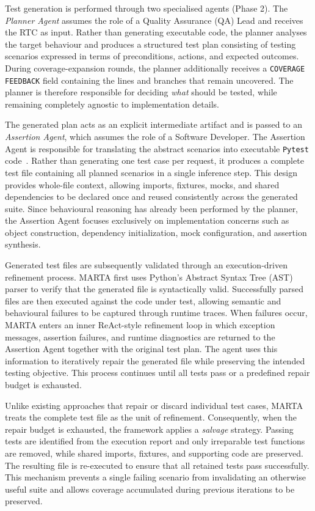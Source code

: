 \documentclass{llncs}
\begin{document}
Test generation is performed through two specialised agents (Phase 2). The \textit{Planner Agent} assumes the role of a Quality Assurance (QA) Lead and receives the RTC as input. Rather than generating executable code, the planner analyses the target behaviour and produces a structured test plan consisting of testing scenarios expressed in terms of preconditions, actions, and expected outcomes. During coverage-expansion rounds, the planner additionally receives a \texttt{COVERAGE FEEDBACK} field containing the lines and branches that remain uncovered. The planner is therefore responsible for deciding \textit{what} should be tested, while remaining completely agnostic to implementation details.

The generated plan acts as an explicit intermediate artifact and is passed to an \textit{Assertion Agent}, which assumes the role of a Software Developer. The Assertion Agent is responsible for translating the abstract scenarios into executable \texttt{Pytest} code~\cite{pytest}. Rather than generating one test case per request, it produces a complete test file containing all planned scenarios in a single inference step. This design provides whole-file context, allowing imports, fixtures, mocks, and shared dependencies to be declared once and reused consistently across the generated suite. Since behavioural reasoning has already been performed by the planner, the Assertion Agent focuses exclusively on implementation concerns such as object construction, dependency initialization, mock configuration, and assertion synthesis.


Generated test files are subsequently validated through an execution-driven refinement process. MARTA first uses Python's Abstract Syntax Tree (AST) parser to verify that the generated file is syntactically valid. Successfully parsed files are then executed against the code under test, allowing semantic and behavioural failures to be captured through runtime traces. When failures occur, MARTA enters an inner ReAct-style refinement loop in which exception messages, assertion failures, and runtime diagnostics are returned to the Assertion Agent together with the original test plan. The agent uses this information to iteratively repair the generated file while preserving the intended testing objective. This process continues until all tests pass or a predefined repair budget is exhausted.

Unlike existing approaches that repair or discard individual test cases, MARTA treats the complete test file as the unit of refinement. Consequently, when the repair budget is exhausted, the framework applies a \textit{salvage} strategy. Passing tests are identified from the execution report and only irreparable test functions are removed, while shared imports, fixtures, and supporting code are preserved. The resulting file is re-executed to ensure that all retained tests pass successfully. This mechanism prevents a single failing scenario from invalidating an otherwise useful suite and allows coverage accumulated during previous iterations to be preserved.
\end{document}
